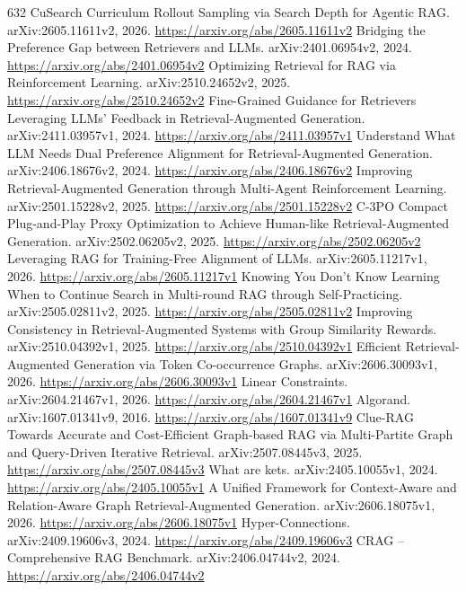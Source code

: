 \documentclass[11pt]{article}
\begin{document}
\begin{thebibliography}{632}
 CuSearch Curriculum Rollout Sampling via Search Depth for Agentic RAG. arXiv:2605.11611v2, 2026. \url{https://arxiv.org/abs/2605.11611v2}
 Bridging the Preference Gap between Retrievers and LLMs. arXiv:2401.06954v2, 2024. \url{https://arxiv.org/abs/2401.06954v2}
 Optimizing Retrieval for RAG via Reinforcement Learning. arXiv:2510.24652v2, 2025. \url{https://arxiv.org/abs/2510.24652v2}
 Fine-Grained Guidance for Retrievers Leveraging LLMs' Feedback in Retrieval-Augmented Generation. arXiv:2411.03957v1, 2024. \url{https://arxiv.org/abs/2411.03957v1}
 Understand What LLM Needs Dual Preference Alignment for Retrieval-Augmented Generation. arXiv:2406.18676v2, 2024. \url{https://arxiv.org/abs/2406.18676v2}
 Improving Retrieval-Augmented Generation through Multi-Agent Reinforcement Learning. arXiv:2501.15228v2, 2025. \url{https://arxiv.org/abs/2501.15228v2}
 C-3PO Compact Plug-and-Play Proxy Optimization to Achieve Human-like Retrieval-Augmented Generation. arXiv:2502.06205v2, 2025. \url{https://arxiv.org/abs/2502.06205v2}
 Leveraging RAG for Training-Free Alignment of LLMs. arXiv:2605.11217v1, 2026. \url{https://arxiv.org/abs/2605.11217v1}
 Knowing You Don't Know Learning When to Continue Search in Multi-round RAG through Self-Practicing. arXiv:2505.02811v2, 2025. \url{https://arxiv.org/abs/2505.02811v2}
 Improving Consistency in Retrieval-Augmented Systems with Group Similarity Rewards. arXiv:2510.04392v1, 2025. \url{https://arxiv.org/abs/2510.04392v1}
 Efficient Retrieval-Augmented Generation via Token Co-occurrence Graphs. arXiv:2606.30093v1, 2026. \url{https://arxiv.org/abs/2606.30093v1}
 Linear Constraints. arXiv:2604.21467v1, 2026. \url{https://arxiv.org/abs/2604.21467v1}
 Algorand. arXiv:1607.01341v9, 2016. \url{https://arxiv.org/abs/1607.01341v9}
 Clue-RAG Towards Accurate and Cost-Efficient Graph-based RAG via Multi-Partite Graph and Query-Driven Iterative Retrieval. arXiv:2507.08445v3, 2025. \url{https://arxiv.org/abs/2507.08445v3}
 What are kets. arXiv:2405.10055v1, 2024. \url{https://arxiv.org/abs/2405.10055v1}
 A Unified Framework for Context-Aware and Relation-Aware Graph Retrieval-Augmented Generation. arXiv:2606.18075v1, 2026. \url{https://arxiv.org/abs/2606.18075v1}
 Hyper-Connections. arXiv:2409.19606v3, 2024. \url{https://arxiv.org/abs/2409.19606v3}
 CRAG -- Comprehensive RAG Benchmark. arXiv:2406.04744v2, 2024. \url{https://arxiv.org/abs/2406.04744v2}

\end{thebibliography}
\end{document}

